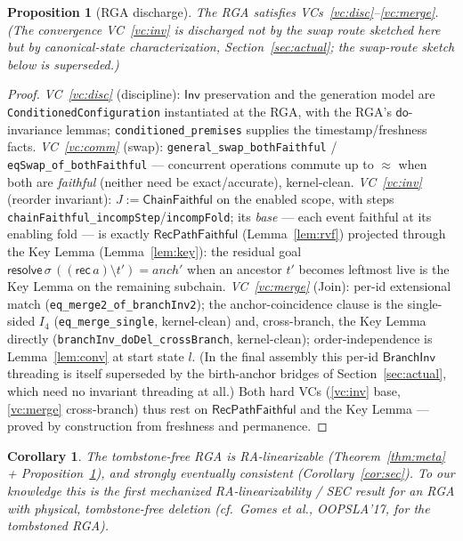 \documentclass[11pt]{article}
\newtheorem{proposition}[theorem]{Proposition}
\newtheorem{corollary}[theorem]{Corollary}
\newcommand{\lean}[1]{\texttt{#1}}
\newcommand{\st}{\sigma}
\newcommand{\dodo}{\mathsf{do}}
\newcommand{\resolve}{\mathsf{resolve}}
\newcommand{\recList}{\mathsf{rec}}
\newcommand{\eqobs}{\approx}
\newcommand{\Inv}{\mathsf{Inv}}
\newcommand{\RVF}{\textsf{RecPathFaithful}}
\newcommand{\ChainFaithful}{\textsf{ChainFaithful}}
\begin{document}
\begin{proposition}[RGA discharge]\label{prop:discharge}
The RGA satisfies VCs~\ref{vc:disc}--\ref{vc:merge}. (The convergence VC~\ref{vc:inv} is
discharged not by the swap route sketched here but by canonical-state characterization,
Section~\ref{sec:actual}; the swap-route sketch below is superseded.)
\end{proposition}
\begin{proof}
\emph{VC~\ref{vc:disc}} (discipline): $\Inv$ preservation and the generation model are
\lean{ConditionedConfiguration} instantiated at the RGA, with the RGA's $\dodo$-invariance
lemmas; \lean{conditioned\_premises} supplies the timestamp/freshness facts.
\emph{VC~\ref{vc:comm}} (swap): \lean{general\_swap\_bothFaithful} /
\lean{eqSwap\_of\_bothFaithful} --- concurrent operations commute up to $\eqobs$ when both
are \emph{faithful} (neither need be exact/accurate), kernel-clean.
\emph{VC~\ref{vc:inv}} (reorder invariant): $J := \ChainFaithful$ on the enabled scope, with
steps \lean{chainFaithful\_incompStep}/\lean{incompFold}; its \emph{base} --- each event
faithful at its enabling fold --- is exactly $\RVF$ (Lemma~\ref{lem:rvf}) projected through
the Key Lemma (Lemma~\ref{lem:key}): the residual goal
$\resolve\,\st\,((\recList\,a)\setminus t') = anch'$ when an ancestor $t'$ becomes leftmost
live is the Key Lemma on the remaining subchain.
\emph{VC~\ref{vc:merge}} (Join): per-id extensional match
(\lean{eq\_merge2\_of\_branchInv2}); the anchor-coincidence clause is the single-sided
$I_4$ (\lean{eq\_merge\_single}, kernel-clean) and, cross-branch, the Key Lemma directly
(\lean{branchInv\_doDel\_crossBranch}, kernel-clean); order-independence is Lemma~\ref{lem:conv}
at start state $l$. (In the final assembly this per-id $\mathsf{BranchInv}$ threading is
itself superseded by the birth-anchor bridges of Section~\ref{sec:actual}, which need no
invariant threading at all.)
Both hard VCs (\ref{vc:inv} base, \ref{vc:merge} cross-branch) thus rest on $\RVF$ and the
Key Lemma --- proved by construction from freshness and permanence.
\end{proof}

\begin{corollary}
The tombstone-free RGA is RA-linearizable (Theorem~\ref{thm:meta} + Proposition~\ref{prop:discharge}),
and strongly eventually consistent (Corollary~\ref{cor:sec}). To our knowledge this is the
first mechanized RA-linearizability / SEC result for an RGA with physical, tombstone-free
deletion (cf.\ Gomes et al., OOPSLA'17, for the tombstoned RGA).
\end{corollary}
\end{document}
